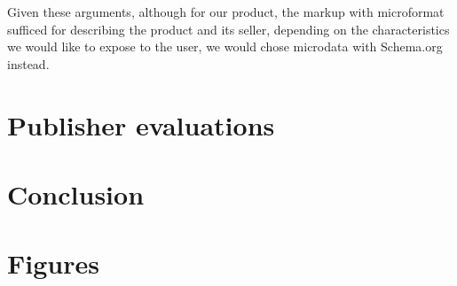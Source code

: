 \documentclass{acm_proc_10ptArticle-sp}
\begin{document}
Given these arguments, although for our product, the markup with microformat sufficed for describing the product and its seller, depending on the characteristics we would like to expose to the user, we would chose microdata with Schema.org instead. 


\section{Publisher evaluations}

\section{Conclusion}





\appendix
\section{Figures}
\end{document}
